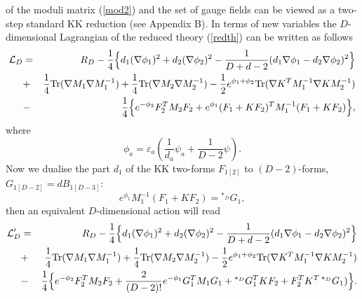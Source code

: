 \documentclass[a4paper,12pt]{article}
\def\Tr{{\rm Tr}}
\begin{document}
of the moduli matrix (\ref{mod2}) and the set of gauge fields can
be viewed as a two-step standard KK reduction (see Appendix B).
In terms of new variables the $D$-dimensional Lagrangian of the
reduced theory (\ref{redth}) can be written as follows
\begin{eqnarray}\label{nond}
{\cal L}_{D} &=& R_{D} - \frac14 \Bigl\{ d_1 (\nabla\phi_1)^2 +
d_2 (\nabla\phi_2)^2 - \frac1{D+d-2}(d_1 \nabla\phi_1 - d_2
\nabla\phi_2)^2 \Bigr\} \nonumber\\
&+& \frac14 \Tr(\nabla M_1 \nabla M_1^{-1}) + \frac14 \Tr(\nabla
M_2 \nabla M_2^{-1}) - \frac12 e^{\phi_1+\phi_2}
\Tr(\nabla K^T M_1^{-1} \nabla K M_2^{-1}) \nonumber\\
&-& \frac14 \Bigl\{ e^{-\phi_2} F_2^T M_2 F_2 + e^{\phi_1}(F_1 +
K F_2)^T M_1^{-1} (F_1 + K F_2) \Bigr\},
\end{eqnarray}
where
\begin{equation}
\phi_a = \varepsilon_a \left( \frac1{d_a} \psi_a + \frac1{D-2}
\psi \right). \label{Fb}
\end{equation}
Now we dualise the part $d_1$ of the KK two-forms $F_{1[2]}$ to
$(D-2)$-forms, $G_{1[D-2]}=dB_{1[D-3]}$:
\begin{equation}
e^{\phi_1} M_1^{-1} (F_1 + K F_2) = {}^{*_D} G_1,
\end{equation}
then an equivalent $D$-dimensional action will read
\begin{eqnarray}\label{DDD}
{\cal L}_{D}' &=& R_{D} - \frac14 \Bigl\{ d_1 (\nabla\phi_1)^2 +
d_2 (\nabla\phi_2)^2 - \frac1{D+d-2}(d_1 \nabla\phi_1 - d_2
\nabla\phi_2)^2 \Bigr\} \nonumber\\
&+& \frac14 \Tr(\nabla M_1 \nabla M_1^{-1}) + \frac14 \Tr(\nabla
M_2 \nabla M_2^{-1}) - \frac12 e^{\phi_1+\phi_2}
\Tr(\nabla K^T M_1^{-1} \nabla K M_2^{-1}) \nonumber\\
&-& \frac14 \Bigl\{ e^{-\phi_2} F_2^T M_2 F_2 + \frac2{(D-2)!}
e^{-\phi_1} G_1^T M_1 G_1 + {}^{*_D} G_1^T K F_2 + F_2^T K^T\,
{}^{*_D} G_1) \Bigr\}.
\end{eqnarray}
\end{document}
